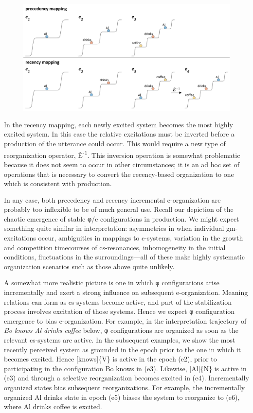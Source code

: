   
\begin{figure}
\includegraphics[width=\textwidth]{figures/Tilsen-img128.png}
\caption{\missingcaption}
\label{fig:}
\end{figure}
 

  In the recency mapping, each newly excited system becomes the most highly excited system. In this case the relative excitations must be inverted before a production of the utterance could occur. This would require a new type of reorganization operator, Ê\textsuperscript{{}-1}. This inversion operation is somewhat problematic because it does not seem to occur in other circumstances; it is an ad hoc set of operations that is necessary to convert the recency-based organization to one which is consistent with production.

  In any case, both precedency and recency incremental e-organization are probably too inflexible to be of much general use. Recall our depiction of the chaotic emergence of stable φ/e configurations in production. We might expect something quite similar in interpretation: asymmetries in when individual gm-excitations occur, ambiguities in mappings to c-systems, variation in the growth and competition timecourses of cs-resonances, inhomogeneity in the initial conditions, fluctuations in the surroundings—all of these make highly systematic organization scenarios such as those above quite unlikely.

  A somewhat more realistic picture is one in which φ configurations arise incrementally and exert a strong influence on subsequent e-organization. Meaning relations can form as cs-systems become active, and part of the stabilization process involves excitation of those systems. Hence we expect φ configuration emergence to bias e-organization. For example, in the interpretation trajectory of \textit{Bo knows Al drinks coffee} below, φ configurations are organized as soon as the relevant cs-systems are active. In the subsequent examples, we show the most recently perceived system as grounded in the epoch prior to the one in which it becomes excited.  Hence [knows]\{V\} is active in the epoch (e2), prior to participating in the configuration {\textbar}Bo knows{\textbar} in (e3). Likewise, [Al]\{N\} is active in (e3) and through a selective reorganization becomes excited in (e4). Incrementally organized states bias subsequent reorganizations. For example, the incrementally organized {\textbar}Al drinks{\textbar} state in epoch (e5) biases the system to reorganize to (e6), where {\textbar}Al drinks coffee{\textbar} is excited. 

